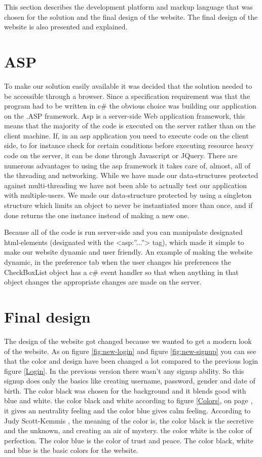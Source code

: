This section describes the development platform and markup language that was chosen for the solution and the final design of the website. The final design of the website is also presented and explained.

\section{ASP}
To make our solution easily available it was decided that the solution needed to be accessible through a browser. Since a specification requirement was that the program had to be written in c\# the obvious choice was building our application on the .ASP framework. Asp is a server-side Web application framework, this means that the majority of the code is executed on the server rather than on the client machine. If, in an asp application you need to execute code on the client side, to for instance check for certain conditions before executing resource heavy code on the server, it can be done through Javascript or JQuery. There are numerous advantages to using the asp framework it takes care of, almost, all of the threading and networking. While we have made our data-structures protected against multi-threading we have not been able to actually test our application with multiple-users. We made our data-structure protected by using a singleton structure which limits an object to never be instantiated more than once, and if done returns the one instance instead of making a new one.

Because all of the code is run server-side and you can manipulate designated html-elements  (designated with the <asp:”...”> tag), which made it simple to make our website dynamic and user friendly. An example of making the website dynamic, in the preference tab when the user changes his preferences the CheckBoxList object has a c\# event handler so that when anything in that object changes the appropriate changes are made on the server.

\section{Final design}
The design of the website got changed because we wanted to get a modern look of the website. As on figure \ref{fig:new-login} and figure \ref{fig:new-signup} you can see that the color and design have been changed a lot compared to the previous login figure \ref{Login}. In the previous version there wasn’t any signup ability. So this signup does only the basics like creating username, password, gender and date of birth. The color black was chosen for the background and it blends good with blue and white. the color black and white according to figure \ref{Colors}, on page \pageref{Colors}, it gives an neutrality feeling and the color blue gives calm feeling. According to Judy Scott-Kemmis \cite{EmpowerColor}, the meaning of the color is,  the color black is the secretive and the unknown, and creating an air of mystery. the color white is the color of perfection. The color blue is the color of trust and peace. The color black, white and blue is the basic colors for the website.


